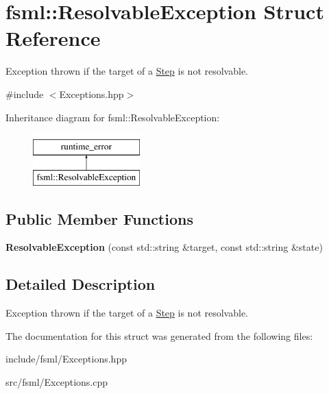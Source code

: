\hypertarget{structfsml_1_1ResolvableException}{\section{fsml\-:\-:Resolvable\-Exception Struct Reference}
\label{structfsml_1_1ResolvableException}
}


Exception thrown if the target of a \hyperlink{classfsml_1_1Step}{Step} is not resolvable.  




{\ttfamily \#include $<$Exceptions.\-hpp$>$}

Inheritance diagram for fsml\-:\-:Resolvable\-Exception\-:\begin{figure}[H]
\begin{center}
\leavevmode
\includegraphics[height=2.000000cm]{structfsml_1_1ResolvableException}
\end{center}
\end{figure}
\subsection*{Public Member Functions}
\begin{DoxyCompactItemize}
\item 
\hypertarget{structfsml_1_1ResolvableException_abe17276c3a06e7a331d9e3db7d480af8}{{\bfseries Resolvable\-Exception} (const std\-::string \&target, const std\-::string \&state)}\label{structfsml_1_1ResolvableException_abe17276c3a06e7a331d9e3db7d480af8}

\end{DoxyCompactItemize}


\subsection{Detailed Description}
Exception thrown if the target of a \hyperlink{classfsml_1_1Step}{Step} is not resolvable. 



The documentation for this struct was generated from the following files\-:\begin{DoxyCompactItemize}
\item 
include/fsml/Exceptions.\-hpp\item 
src/fsml/Exceptions.\-cpp\end{DoxyCompactItemize}
